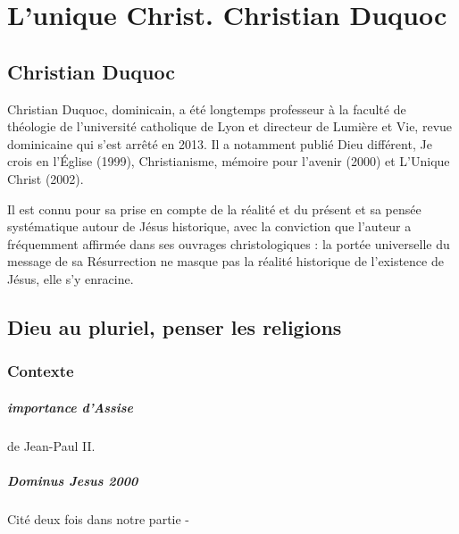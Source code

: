\chapter{L'unique Christ. Christian Duquoc}
\section{Christian Duquoc} Christian Duquoc, dominicain, a été longtemps professeur à la faculté de théologie de l'université catholique de Lyon et directeur de Lumière et Vie, revue dominicaine qui s'est arrêté en 2013. Il a notamment publié Dieu différent, Je crois en l'Église (1999), Christianisme, mémoire pour l'avenir (2000) et L'Unique Christ (2002). 

Il est connu pour sa prise en compte de la réalité et du présent  et sa pensée systématique autour de Jésus historique, avec la conviction  que l’auteur a fréquemment affirmée dans ses ouvrages christologiques : la portée universelle du message de sa Résurrection ne masque pas la réalité historique de l’existence de Jésus, elle s’y enracine.



 

\section{Dieu au pluriel, penser les religions}




\subsection{Contexte}
\paragraph{importance d'Assise} de Jean-Paul II.


\paragraph{Dominus Jesus 2000} Cité deux fois dans notre partie - 

